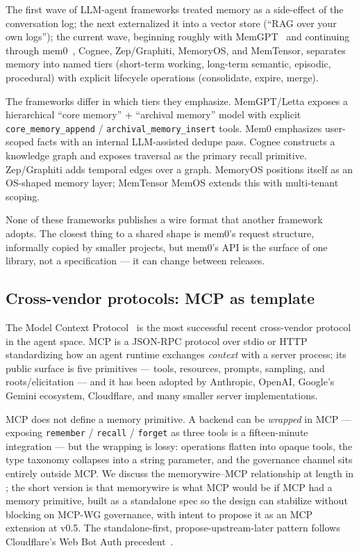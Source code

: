 \documentclass[11pt,letterpaper,twocolumn]{article}
\begin{document}
The first wave of LLM-agent frameworks treated memory as a side-effect of the conversation log; the next externalized it into a vector store (``RAG over your own logs''); the current wave, beginning roughly with MemGPT~\cite{packer2023memgpt} and continuing through mem0~\cite{chhikara2025mem0}, Cognee, Zep/Graphiti, MemoryOS, and MemTensor, separates memory into named tiers (short-term working, long-term semantic, episodic, procedural) with explicit lifecycle operations (consolidate, expire, merge).

The frameworks differ in which tiers they emphasize. MemGPT/Letta exposes a hierarchical ``core memory'' + ``archival memory'' model with explicit \texttt{core\_memory\_append} / \texttt{archival\_memory\_insert} tools. Mem0 emphasizes user-scoped facts with an internal LLM-assisted dedupe pass. Cognee constructs a knowledge graph and exposes traversal as the primary recall primitive. Zep/Graphiti adds temporal edges over a graph. MemoryOS positions itself as an OS-shaped memory layer; MemTensor MemOS extends this with multi-tenant scoping.

None of these frameworks publishes a wire format that another framework adopts. The closest thing to a shared shape is mem0's request structure, informally copied by smaller projects, but mem0's API is the surface of one library, not a specification --- it can change between releases.

\subsection{Cross-vendor protocols: MCP as template}

The Model Context Protocol~\cite{mcp_spec_2025} is the most successful recent cross-vendor protocol in the agent space. MCP is a JSON-RPC protocol over stdio or HTTP standardizing how an agent runtime exchanges \emph{context} with a server process; its public surface is five primitives --- tools, resources, prompts, sampling, and roots/elicitation --- and it has been adopted by Anthropic, OpenAI, Google's Gemini ecosystem, Cloudflare, and many smaller server implementations.

MCP does not define a memory primitive. A backend can be \emph{wrapped} in MCP --- exposing \texttt{remember} / \texttt{recall} / \texttt{forget} as three tools is a fifteen-minute integration --- but the wrapping is lossy: operations flatten into opaque tools, the type taxonomy collapses into a string parameter, and the governance channel sits entirely outside MCP. We discuss the memorywire--MCP relationship at length in ; the short version is that memorywire is what MCP would be if MCP had a memory primitive, built as a standalone spec so the design can stabilize without blocking on MCP-WG governance, with intent to propose it as an MCP extension at v0.5. The standalone-first, propose-upstream-later pattern follows Cloudflare's Web Bot Auth precedent~\cite{meunier2026webbotauth}.
\end{document}
